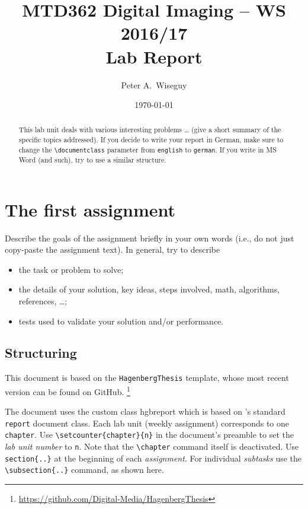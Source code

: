 \documentclass[english,notitlepage]{hgbreport}
\author{Peter A.\ Wiseguy}
\title{MTD362 Digital Imaging -- WS 2016/17\\
				Lab Report \arabic{chapter}}
\date{\today}
\renewcommand{\chapter}[1]{}	%
\begin{document}
\maketitle

\begin{abstract}\noindent
This lab unit deals with various interesting problems  \ldots 
(give a short summary of the specific topics addressed).
If you decide to write your report in German, make sure to
change the \verb!\documentclass! parameter from \texttt{english}
to \texttt{german}.
If you write in MS Word (and such), try to use a similar structure.
\end{abstract}



\section{The first assignment}

Describe the goals of the assignment briefly in your own words
(i.e., do not just copy-paste the assignment text).
In general, try to describe
\begin{itemize}
\item
	the task or problem to solve;
\item
	the details of your solution, key ideas, steps involved, math, algorithms,
	references, \ldots ;
\item
	tests used to validate your solution and/or performance.
\end{itemize}

\subsection{Structuring}	%

This \latex document is based on the \texttt{HagenbergThesis} 
template, whose most recent version can be found on GitHub.%
\footnote{\url{https://github.com/Digital-Media/HagenbergThesis}}

The document uses the custom class \textsf{hgbreport} which is based
on \latex's standard \texttt{report} document class. Each lab unit 
(weekly assignment) corresponds to one \texttt{chapter}.
Use \verb!\setcounter{chapter}{n}! in the document's preamble
to set the \emph{lab unit number} to \texttt{n}.
Note that the \verb!\chapter! command itself is deactivated.
Use \verb!section{..}! at the beginning of each \emph{assignment}.
For individual \emph{subtasks} use the 
\verb!\subsection{..}! command, as shown here.
\end{document}
